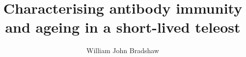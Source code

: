 \title{Characterising antibody immunity and ageing in a short-lived teleost}


\author{William John Bradshaw}








\supervisorlinewidth{\textwidth}

     

